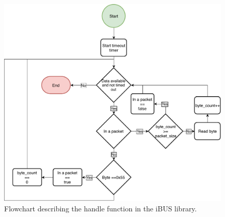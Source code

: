 \begin{figure}[h]
    \centering
    \includegraphics[width=\columnwidth]{figures/ch_design/ibus-handle-flowchart.pdf}
    \caption{Flowchart describing the handle function in the iBUS library.}
    \label{fig:ibus_handle_flowchart}
\end{figure}

